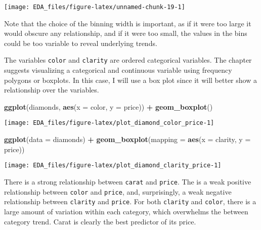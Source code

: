 \documentclass[]{book}
\newenvironment{Shaded}{\begin{snugshade}}{\end{snugshade}}
\newcommand{\DataTypeTok}[1]{\textcolor[rgb]{0.13,0.29,0.53}{#1}}
\newcommand{\KeywordTok}[1]{\textcolor[rgb]{0.13,0.29,0.53}{\textbf{#1}}}
\newcommand{\NormalTok}[1]{#1}
\newcommand{\OperatorTok}[1]{\textcolor[rgb]{0.81,0.36,0.00}{\textbf{#1}}}
\newcommand{\StringTok}[1]{\textcolor[rgb]{0.31,0.60,0.02}{#1}}
\theoremstyle{plain}
\theoremstyle{remark}
\begin{document}
\begin{center}\texttt{[image: EDA\_files/figure-latex/unnamed-chunk-19-1]} \end{center}

Note that the choice of the binning width is important, as if it were
too large it would obscure any relationship, and if it were too small,
the values in the bins could be too variable to reveal underlying
trends.

The variables \texttt{color} and \texttt{clarity} are ordered
categorical variables. The chapter suggests visualizing a categorical
and continuous variable using frequency polygons or boxplots. In this
case, I will use a box plot since it will better show a relationship
over the variables.

\begin{Shaded}
\begin{Highlighting}[]
\KeywordTok{ggplot}\NormalTok{(diamonds, }\KeywordTok{aes}\NormalTok{(}\DataTypeTok{x =}\NormalTok{ color, }\DataTypeTok{y =}\NormalTok{ price)) }\OperatorTok{+}
\StringTok{  }\KeywordTok{geom_boxplot}\NormalTok{()}
\end{Highlighting}
\end{Shaded}

\begin{center}\texttt{[image: EDA\_files/figure-latex/plot\_diamond\_color\_price-1]} \end{center}

\begin{Shaded}
\begin{Highlighting}[]
\KeywordTok{ggplot}\NormalTok{(}\DataTypeTok{data =}\NormalTok{ diamonds) }\OperatorTok{+}
\StringTok{  }\KeywordTok{geom_boxplot}\NormalTok{(}\DataTypeTok{mapping =} \KeywordTok{aes}\NormalTok{(}\DataTypeTok{x =}\NormalTok{ clarity, }\DataTypeTok{y =}\NormalTok{ price))}
\end{Highlighting}
\end{Shaded}

\begin{center}\texttt{[image: EDA\_files/figure-latex/plot\_diamond\_clarity\_price-1]} \end{center}

There is a strong relationship between \texttt{carat} and
\texttt{price}. The is a weak positive relationship between
\texttt{color} and \texttt{price}, and, surprisingly, a weak negative
relationship between \texttt{clarity} and \texttt{price}. For both
\texttt{clarity} and \texttt{color}, there is a large amount of
variation within each category, which overwhelms the between category
trend. Carat is clearly the best predictor of its price.
\end{document}
